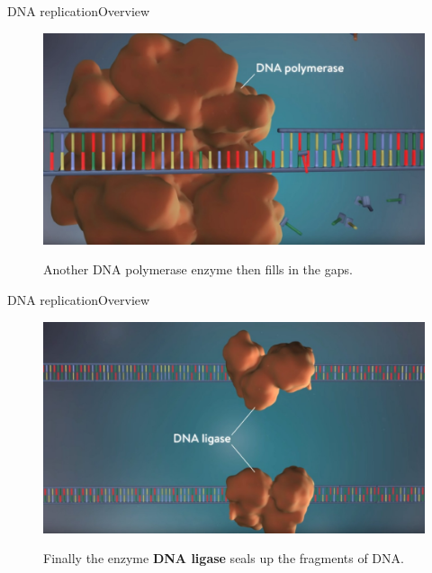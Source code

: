 \documentclass[10pt]{beamer}
\begin{document}
{%
\begin{frame}{DNA replication}{Overview}
	\begin{figure}[]
		\centering
		\includegraphics[width=\textwidth,height=0.6\textheight,keepaspectratio]{img/introduction/dna47.jpg}
		\label{img:mot2}
		\caption{Another DNA polymerase enzyme then fills in the gaps.}
	\end{figure}
\end{frame}


\begin{frame}{DNA replication}{Overview}
	\begin{figure}[]
		\centering
		\includegraphics[width=\textwidth,height=0.6\textheight,keepaspectratio]{img/introduction/dna48.jpg}
		\label{img:mot2}
		\caption{Finally the enzyme \textbf{DNA ligase} seals up the fragments of DNA.}
	\end{figure}
\end{frame}

}
\end{document}
